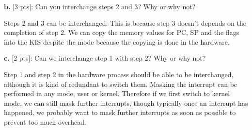 \documentclass[12pt]{article}
\begin{document}
{\bf b.} [3 pts]: Can you interchange steps 2 and 3? Why or why not?

Steps 2 and 3 can be interchanged. This is because step 3 doesn't depends on the completion of step 2. We can copy the memory values for PC, SP and the flags into the KIS despite the mode because the copying is done in the hardware.

{\bf c.} [2 pts]: Can we interchange step 1 with step 2? Why or why not?

Step 1 and step 2 in the hardware process should be able to be interchanged, although it is kind of redundant to switch them. Masking the interrupt can be performed in any mode, user or kernel. Therefore if we first switch to kernel mode, we can still mask further interrupts, though typically once an interrupt has happened, we probably want to mask further interrupts as soon as possible to prevent too much overhead. 
\end{document}
